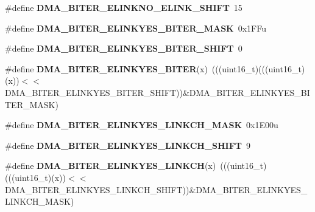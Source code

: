 \begin{DoxyCompactItemize}
\item 
\#define {\bfseries D\+M\+A\+\_\+\+B\+I\+T\+E\+R\+\_\+\+E\+L\+I\+N\+K\+N\+O\+\_\+\+E\+L\+I\+N\+K\+\_\+\+S\+H\+I\+FT}~15\hypertarget{group__DMA__Register__Masks_gabd481ef160447f9125c779d6483649f0}{}\label{group__DMA__Register__Masks_gabd481ef160447f9125c779d6483649f0}

\item 
\#define {\bfseries D\+M\+A\+\_\+\+B\+I\+T\+E\+R\+\_\+\+E\+L\+I\+N\+K\+Y\+E\+S\+\_\+\+B\+I\+T\+E\+R\+\_\+\+M\+A\+SK}~0x1\+F\+Fu\hypertarget{group__DMA__Register__Masks_ga6e5cea6df954df3bc7501c0074e7c52b}{}\label{group__DMA__Register__Masks_ga6e5cea6df954df3bc7501c0074e7c52b}

\item 
\#define {\bfseries D\+M\+A\+\_\+\+B\+I\+T\+E\+R\+\_\+\+E\+L\+I\+N\+K\+Y\+E\+S\+\_\+\+B\+I\+T\+E\+R\+\_\+\+S\+H\+I\+FT}~0\hypertarget{group__DMA__Register__Masks_ga6528aadc37f35d20d63354f8b755d11e}{}\label{group__DMA__Register__Masks_ga6528aadc37f35d20d63354f8b755d11e}

\item 
\#define {\bfseries D\+M\+A\+\_\+\+B\+I\+T\+E\+R\+\_\+\+E\+L\+I\+N\+K\+Y\+E\+S\+\_\+\+B\+I\+T\+ER}(x)~(((uint16\+\_\+t)(((uint16\+\_\+t)(x))$<$$<$D\+M\+A\+\_\+\+B\+I\+T\+E\+R\+\_\+\+E\+L\+I\+N\+K\+Y\+E\+S\+\_\+\+B\+I\+T\+E\+R\+\_\+\+S\+H\+I\+FT))\&D\+M\+A\+\_\+\+B\+I\+T\+E\+R\+\_\+\+E\+L\+I\+N\+K\+Y\+E\+S\+\_\+\+B\+I\+T\+E\+R\+\_\+\+M\+A\+SK)\hypertarget{group__DMA__Register__Masks_ga03d7581566df49ec66bd0f49c364ef6c}{}\label{group__DMA__Register__Masks_ga03d7581566df49ec66bd0f49c364ef6c}

\item 
\#define {\bfseries D\+M\+A\+\_\+\+B\+I\+T\+E\+R\+\_\+\+E\+L\+I\+N\+K\+Y\+E\+S\+\_\+\+L\+I\+N\+K\+C\+H\+\_\+\+M\+A\+SK}~0x1\+E00u\hypertarget{group__DMA__Register__Masks_gaae29d9573a40f548fb59ef26557d43df}{}\label{group__DMA__Register__Masks_gaae29d9573a40f548fb59ef26557d43df}

\item 
\#define {\bfseries D\+M\+A\+\_\+\+B\+I\+T\+E\+R\+\_\+\+E\+L\+I\+N\+K\+Y\+E\+S\+\_\+\+L\+I\+N\+K\+C\+H\+\_\+\+S\+H\+I\+FT}~9\hypertarget{group__DMA__Register__Masks_gac10d4afb5b6f8caa42e7ef897b700cd6}{}\label{group__DMA__Register__Masks_gac10d4afb5b6f8caa42e7ef897b700cd6}

\item 
\#define {\bfseries D\+M\+A\+\_\+\+B\+I\+T\+E\+R\+\_\+\+E\+L\+I\+N\+K\+Y\+E\+S\+\_\+\+L\+I\+N\+K\+CH}(x)~(((uint16\+\_\+t)(((uint16\+\_\+t)(x))$<$$<$D\+M\+A\+\_\+\+B\+I\+T\+E\+R\+\_\+\+E\+L\+I\+N\+K\+Y\+E\+S\+\_\+\+L\+I\+N\+K\+C\+H\+\_\+\+S\+H\+I\+FT))\&D\+M\+A\+\_\+\+B\+I\+T\+E\+R\+\_\+\+E\+L\+I\+N\+K\+Y\+E\+S\+\_\+\+L\+I\+N\+K\+C\+H\+\_\+\+M\+A\+SK)\hypertarget{group__DMA__Register__Masks_ga90c0049ad1dc4dc1ea3f546e4cf6ccf8}{}\label{group__DMA__Register__Masks_ga90c0049ad1dc4dc1ea3f546e4cf6ccf8}


\end{DoxyCompactItemize}
